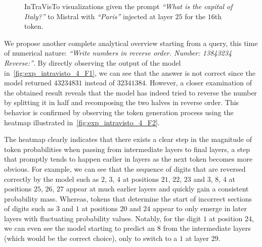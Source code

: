\begin{figure}[t!]
    \centering
    \begingroup%
    \captionsetup{width=0.63\textwidth}%
    \endgroup%
    \caption[InTraVisTo visualizations given the prompt \emph{``What is the capital of Italy?''} to Mistral with injections.]{InTraVisTo visualizations given the prompt \emph{``What is the capital of Italy?''} to Mistral with \emph{``Paris''} injected at layer $25$ for the $16$th token.}
    \label{fig:exp_intravisto_4_E}
\end{figure}

We propose another complete analytical overview starting from a query, this time of numerical nature: \emph{``Write numbers in reverse order. Number: 13843234 Reverse:''}.
By directly observing the output of the model in~\cref{fig:exp_intravisto_4_F1}, we can see that the answer is not correct since the model returned $43234831$ instead of $32341384$.
However, a closer examination of the obtained result reveals that the model has indeed tried to reverse the number by splitting it in half and recomposing the two halves in reverse order.
This behavior is confirmed by observing the token generation process using the heatmap illustrated in~\cref{fig:exp_intravisto_4_F2}.

The heatmap clearly indicates that there exists a clear step in the magnitude of token probabilities when passing from intermediate layers to final layers, a step that promptly tends to happen earlier in layers as the next token becomes more obvious.
For example, we can see that the sequence of digits that are reversed correctly by the model such as $2$, $3$, $4$ at positions $21$, $22$, $23$ and $3$, $8$, $4$ at positions $25$, $26$, $27$ appear at much earlier layers and quickly gain a consistent probability mass.
Whereas, tokens that determine the start of incorrect sections of digits such as $3$ and $1$ at positions $20$ and $24$ appear to only emerge in later layers with fluctuating probability values.
Notably, for the digit $1$ at position $24$, we can even see the model starting to predict an $8$ from the intermediate layers (which would be the correct choice), only to switch to a $1$ at layer $29$.

